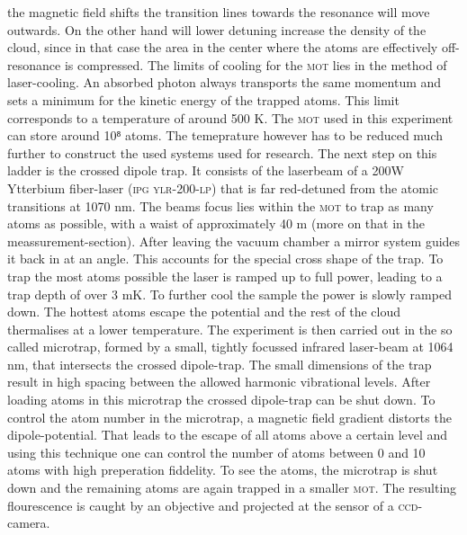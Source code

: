 the magnetic field shifts the transition lines towards the resonance will move outwards. On the other hand will lower detuning increase the density of the cloud, since in that case the area in the center where the atoms are effectively off-resonance is compressed. The limits of cooling for the \textsc{mot} lies in the method of laser-cooling. An absorbed photon always transports the same momentum and sets a minimum for the kinetic energy of the trapped atoms. This limit corresponds to a temperature of around 500 \mu K. The \textsc{mot} used in this experiment can store around 10⁸ atoms. The temeprature however has to be reduced much further to construct the used systems used for research. The next step on this ladder is the crossed dipole trap. It consists of the laserbeam of a 200W Ytterbium fiber-laser (\textsc{ipg ylr-200-lp}) that is far red-detuned from the atomic transitions at 1070 nm. The beams focus lies within the \textsc{mot} to trap as many atoms as possible, with a waist of approximately 40 \mu m (more on that in the meassurement-section). After leaving the vacuum chamber a mirror system guides it back in at an angle. This accounts for the special cross shape of the trap. To trap the most atoms possible the laser is ramped up to full power, leading to a trap depth of over 3 mK. To further cool the sample the power is slowly ramped down. The hottest atoms escape the potential and the rest of the cloud thermalises at a lower temperature. The experiment is then carried out in the so called microtrap, formed by a small, tightly focussed infrared laser-beam at 1064 nm, that intersects the crossed dipole-trap. The small dimensions of the trap result in high spacing between the allowed harmonic vibrational levels. After loading atoms in this microtrap the crossed dipole-trap can be shut down. To control the atom number in the microtrap, a magnetic field gradient distorts the dipole-potential. That leads to the escape of all atoms above a certain level and using this technique one can control the number of atoms between 0 and 10 atoms with high preperation fiddelity. To see the atoms, the microtrap is shut down and the remaining atoms are again trapped in a smaller \textsc{mot}. The resulting flourescence is caught by an objective and projected at the sensor of a \textsc{ccd}-camera. 


